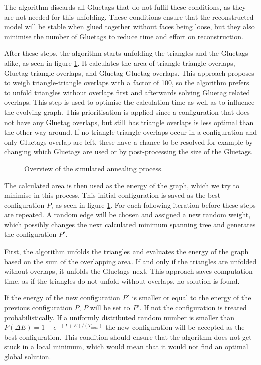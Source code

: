 \documentclass[draft,final]{vutinfth} %
\begin{document}
The algorithm discards all Gluetags that do not fulfil these conditions, as they are not needed for this unfolding. These conditions ensure that the reconstructed model will be stable when glued together without faces being loose, but they also minimise the number of Gluetags to reduce time and effort on reconstruction.

After these steps, the algorithm starts unfolding the triangles and the Gluetags alike, as seen in figure \ref{fig:concept}. It calculates the area of triangle-triangle overlaps, Gluetag-triangle overlaps, and Gluetag-Gluetag overlaps. This approach proposes to weigh triangle-triangle overlaps with a factor of 100, so the algorithm prefers to unfold triangles without overlaps first and afterwards solving Gluetag related overlaps. This step is used to optimise the calculation time as well as to influence the evolving graph. This prioritisation is applied since a configuration that does not have any Gluetag overlaps, but still has triangle overlaps is less optimal than the other way around. If no triangle-triangle overlaps occur in a configuration and only Gluetags overlap are left, these have a chance to be resolved for example by changing which Gluetags are used or by post-processing the size of the Gluetags.

\begin{figure}

\caption{Overview of the simulated annealing process.}
\label{fig:concept}
\end{figure}

The calculated area is then used as the energy of the graph, which we try to minimise in this process. This initial configuration is saved as the best configuration $P$, as seen in figure \ref{fig:concept}. For each following iteration before these steps are repeated. A random edge will be chosen and assigned a new random weight, which possibly changes the next calculated minimum spanning tree and generates the configuration $P'$.

First, the algorithm unfolds the triangles and evaluates the energy of the graph based on the sum of the overlapping area. If and only if the triangles are unfolded without overlaps, it unfolds the Gluetags next. This approach saves computation time, as if the triangles do not unfold without overlaps, no solution is found.

If the energy of the new configuration $P'$ is smaller or equal to the energy of the previous configuration $P$, $P$ will be set to $P'$. If not the configuration is treated probabilistically. If a uniformly distributed random number is smaller than $P(\Delta E) = 1 - e^{-(T + E)/(T_{max})}$ the new configuration will be accepted as the best configuration. This condition should ensure that the algorithm does not get stuck in a local minimum, which would mean that it would not find an optimal global solution.
\end{document}
